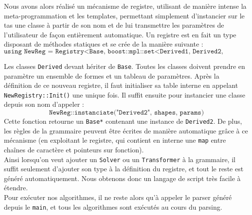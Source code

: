 Nous avons alors réalisé un mécanisme de registre, utilisant de manière intense la meta-programmation et les templates, permettant simplement d'instancier sur le tas une classe à partir de son nom et de lui transmettre les paramètres de l'utilisateur de façon entièrement automatique. Un registre est en fait un type disposant de méthodes statiques et se crée de la manière suivante :
$$\texttt{using NewReg = Registry<Base, boost::mpl::set<Derived1, Derived2, ...>::type>}$$

Les classes \texttt{Derived} devant hériter de \texttt{Base}. Toutes les classes doivent prendre en paramètre un ensemble de formes et un tableau de paramètres. Après la définition de ce nouveau registre, il faut initialiser sa table interne en appelant \texttt{NewRegistry::Init()} une unique fois. Il suffit ensuite pour instancier une classe depuis son nom d'appeler :
$$\texttt{NewReg::instanciate("Derived2", shapes, params)}$$
Cette fonction retourne un \texttt{Base*} contenant une instance de \texttt{Derived2}. De plus, les règles de la grammaire peuvent être écrites de manière automatique grâce à ce mécanisme (en exploitant le registre, qui contient en interne une \texttt{map} entre chaînes de caractère et pointeurs sur fonction).\\

Ainsi lorsqu'on veut ajouter un \texttt{Solver} ou un \texttt{Transformer} à la grammaire, il suffit seulement d'ajouter son type à la définition du registre, et tout le reste est généré automatiquement. Nous obtenons donc un langage de script très facile à étendre.\\

Pour exécuter nos algorithmes, il ne reste alors qu'à appeler le parser généré depuis le \texttt{main}, et tous les algorithmes sont exécutés au cours du parsing.
    